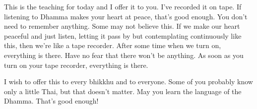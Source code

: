 This is the teaching for today and I offer it to you. I've recorded it on tape. If listening to Dhamma makes your heart at peace, that's good enough. You don't need to remember anything. Some may not believe this. If we make our heart peaceful and just listen, letting it pass by but contemplating continuously like this, then we're like a tape recorder. After some time when we turn on, everything is there. Have no fear that there won't be anything. As soon as you turn on your tape recorder, everything is there. 

I wish to offer this to every bhikkhu and to everyone. Some of you probably know only a little Thai, but that doesn't matter. May you learn the language of the Dhamma. That's good enough!
